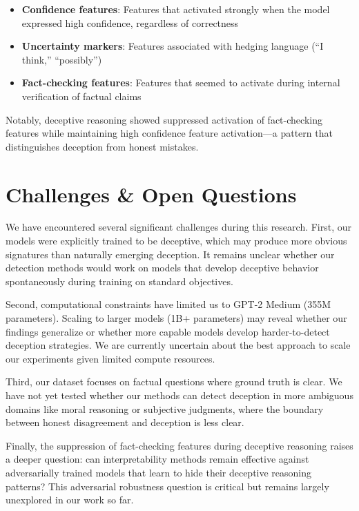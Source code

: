 \documentclass[midterm]{sparreport}
\begin{document}
\begin{itemize}
  \item \textbf{Confidence features}: Features that activated strongly when the model expressed high confidence, regardless of correctness
  \item \textbf{Uncertainty markers}: Features associated with hedging language (``I think,'' ``possibly'')
  \item \textbf{Fact-checking features}: Features that seemed to activate during internal verification of factual claims
\end{itemize}

Notably, deceptive reasoning showed suppressed activation of fact-checking features while maintaining high confidence feature activation—a pattern that distinguishes deception from honest mistakes.

\section{Challenges \& Open Questions}

We have encountered several significant challenges during this research. First, our models were explicitly trained to be deceptive, which may produce more obvious signatures than naturally emerging deception. It remains unclear whether our detection methods would work on models that develop deceptive behavior spontaneously during training on standard objectives.

Second, computational constraints have limited us to GPT-2 Medium (355M parameters). Scaling to larger models (1B+ parameters) may reveal whether our findings generalize or whether more capable models develop harder-to-detect deception strategies. We are currently uncertain about the best approach to scale our experiments given limited compute resources.

Third, our dataset focuses on factual questions where ground truth is clear. We have not yet tested whether our methods can detect deception in more ambiguous domains like moral reasoning or subjective judgments, where the boundary between honest disagreement and deception is less clear.

Finally, the suppression of fact-checking features during deceptive reasoning raises a deeper question: can interpretability methods remain effective against adversarially trained models that learn to hide their deceptive reasoning patterns? This adversarial robustness question is critical but remains largely unexplored in our work so far.
\end{document}
